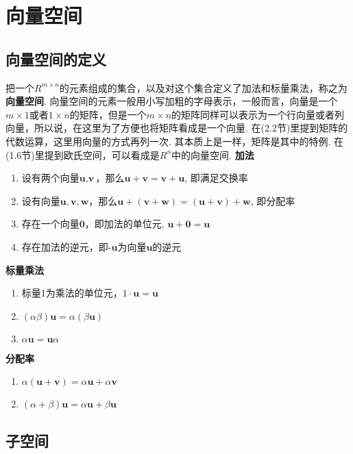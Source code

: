 \section{向量空间}

\subsection{向量空间的定义}
把一个$R^{m\times n}$的元素组成的集合，以及对这个集合定义了加法和标量乘法，称之为\textbf{向量空间}. 向量空间的元素一般用小写加粗的字母表示，一般而言，向量是一个$m\times 1$或者$1 \times n$的矩阵，但是一个$m\times n$的矩阵同样可以表示为一个行向量或者列向量，所以说，在这里为了方便也将矩阵看成是一个向量.  在(2.2节)里提到矩阵的代数运算，这里用向量的方式再列一次. 其本质上是一样，矩阵是其中的特例. 在(1.6节)里提到欧氏空间，可以看成是$R^n$中的向量空间. 
\newline
\textbf{加法}\:
\begin{enumerate}
\item 设有两个向量$\textbf{u}, \textbf{v}$，那么$\textbf{u} + \textbf{v} = \textbf{v} + \textbf{u}$, 即满足交换率
\item 设有向量$\textbf{u}, \textbf{v}, \textbf{w}$，那么$\textbf{u} + (\textbf{v} + \textbf{w}) = (\textbf{u} + \textbf{v}) + \textbf{w}$, 即分配率
\item 存在一个向量$\textbf{0}$，即加法的单位元, $\textbf{u} + \textbf{0} = \textbf{u}$
\item 存在加法的逆元，即$\textbf{-u}$为向量$\textbf{u}$的逆元
\end{enumerate}
\textbf{标量乘法}\:
\begin{enumerate}
\item 标量1为乘法的单位元，$1 \cdot \textbf{u} = \textbf{u}$
\item $(\alpha \beta)\textbf{u} = \alpha (\beta \textbf{u})$
\item $\alpha \textbf{u} =\textbf{u}  \alpha$
\end{enumerate}
\textbf{分配率}\:
\begin{enumerate}
\item $\alpha(\textbf{u} + \textbf{v}) = \alpha \textbf{u} + \alpha \textbf{v}$
\item $(\alpha + \beta)\textbf{u} = \alpha \textbf{u} + \beta \textbf{u}$
\end{enumerate}


\subsection{子空间}

